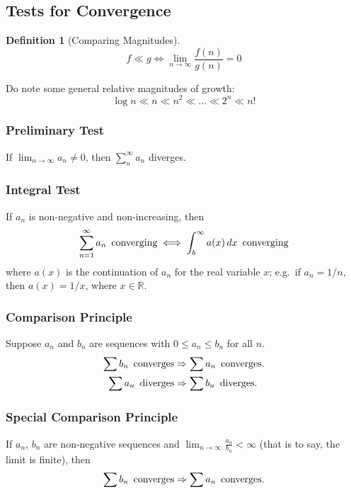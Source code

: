 \documentclass[a4paper]{article}
\numberwithin{equation}{subsection}
\theoremstyle{definition}
\newtheorem{definition}{Definition}[section]
\theoremstyle{remark}
\newenvironment{definitionSR}
{
\begin{siderules}
\begin{definition}
}
{
\end{definition}
\end{siderules}
}
\begin{document}
\subsection{Tests for Convergence}

\begin{definitionSR}[Comparing Magnitudes]
\[
 f \ll g \iff \lim_{n \to \infty } \frac{f(n)}{g(n)} = 0
\]
\end{definitionSR}

Do note some general relative magnitudes of growth:
\begin{equation}
\log n \ll n \ll n^2 \ll \ldots \ll 2^n \ll n!
\end{equation}

\subsubsection{Preliminary Test}
If $\lim_{n \to \infty} a_n \neq 0$, then $\sum_n^\infty a_n$ diverges.

\subsubsection{Integral Test}
If $a_n$ is non-negative and non-increasing, then
\[
	\sum_{n=1}^\infty a_n \text{\, converging} \iff \int_b^\infty a(x)\,dx \text{\, converging}
\]
where $a(x)$ is the continuation of $a_n$ for the real variable $x$; e.g.\ if $a_n = 1/n$, then $a(x) = 1/x$, where $x \in \mathbb{R}$.
\subsubsection{Comparison Principle}
Suppose $a_n$ and $b_n$ are sequences with $0 \leq a_n \leq b_n$ for all $n$.
\begin{align*}
\sum b_n \text{\, converges}  &\Rightarrow \sum a_n \text{\, converges.} \\
\sum a_n \text{\, diverges}  &\Rightarrow \sum b_n \text{\, diverges.}
\end{align*}

\subsubsection{Special Comparison Principle}
If $a_n$, $b_n$ are non-negative sequences and $\lim_{n \to \infty} \frac{a_n}{b_n} < \infty$ (that is to say, the limit is finite), then
\[
\sum b_n \text{\, converges}  \Rightarrow \sum a_n \text{\, converges.} 
\]
\end{document}
